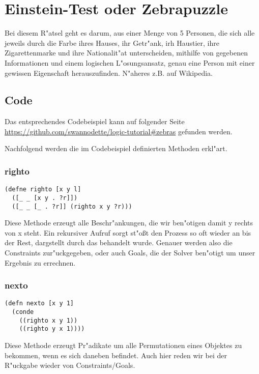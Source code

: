 \section{Einstein-Test oder Zebrapuzzle}

Bei diesem R"atsel geht es darum, aus einer Menge von 5 Personen, die sich alle jeweils durch die Farbe ihres Hauses, ihr Getr"ank, irh Haustier, ihre Zigarettenmarke und ihre Nationalit"at unterscheiden, mithilfe von gegebenen Informationen und einem logischen L"osungsansatz, genau eine Person mit einer gewissen Eigenschaft herauszufinden. N"aheres z.B. auf Wikipedia.

\subsection{Code}

Das entsprechendes Codebeispiel kann auf folgender Seite \url{https://github.com/swannodette/logic-tutorial#zebras} gefunden werden.


Nachfolgend werden die im Codebeispiel definierten Methoden erkl"art.

\subsubsection{righto}

\begin{lstlisting}
(defne righto [x y l]
  ([_ _ [x y . ?r]])
  ([_ _ [_ . ?r]] (righto x y ?r)))
\end{lstlisting}

Diese Methode erzeugt alle Beschr"ankungen, die wir ben"otigen damit \dq{}y\dq{} rechts von \dq{}x\dq{} steht. Ein rekursiver Aufruf sorgt st"o\ss{}t den Prozess so oft wieder an bis der Rest, dargstellt durch das  behandelt wurde. Genauer werden also die Constraints zur"uckgegeben, oder auch Goals, die der Solver ben"otigt um unser Ergebnis zu errechnen.

\subsubsection{nexto}

\begin{lstlisting}
(defn nexto [x y 1]
  (conde
    ((righto x y 1))
    ((righto y x 1))))
\end{lstlisting}

Diese Methode erzeugt Pr"adikate um alle Permutationen eines Objektes zu bekommen, wenn es sich daneben befindet. Auch hier reden wir bei der R"uckgabe wieder von Constraints/Goals.

